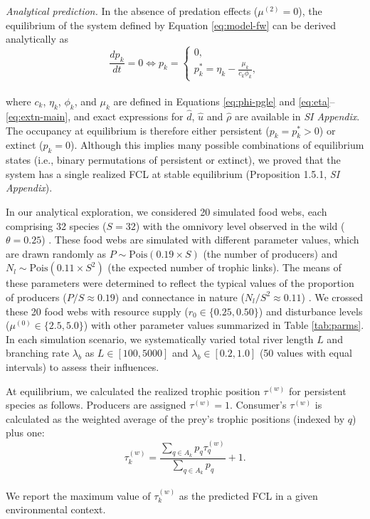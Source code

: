 \documentclass[9pt,twocolumn,twoside]{pnas-new}
\begin{document}
\textit{Analytical prediction.} In the absence of predation effects ($\mu^{(2)} = 0$), the equilibrium of the system defined by Equation \ref{eq:model-fw} can be derived analytically as
\\
\begin{equation}
    \frac{dp_k}{dt} = 0 
    \Leftrightarrow 
    p_k 
    = 
    \begin{cases}
         0,\\
         p_{k}^{*} = \eta_k - \frac{\mu_k}{c_k \phi_k}, 
    \end{cases}
\end{equation}
\\
where $c_k$, $\eta_k$, $\phi_k$, and $\mu_k$ are defined in Equations \ref{eq:phi-pgle} and \ref{eq:eta}--\ref{eq:extn-main}, and exact expressions for $\hat{d}$, $\hat{u}$ and $\hat{\rho}$ are available in \textit{SI Appendix}.
The occupancy at equilibrium is therefore either persistent ($p_k = p_k^* > 0$) or extinct ($p_k = 0$).
Although this implies many possible combinations of equilibrium states (i.e., binary permutations of persistent or extinct), we proved that the system has a single realized FCL at stable equilibrium (Proposition 1.5.1, \textit{SI Appendix}).

In our analytical exploration, we considered 20 simulated food webs, each comprising 32 species ($S = 32$) with the omnivory level observed in the wild ($\theta = 0.25$) \cite{johnson_trophic_2014}.
These food webs are simulated with different parameter values, which are drawn randomly as $P \sim \mbox{Pois}(0.19 \times S)$ (the number of producers) and $N_l \sim \mbox{Pois}(0.11 \times S^2)$ (the expected number of trophic links).
The means of these parameters were determined to reflect the typical values of the proportion of producers ($P / S \approx 0.19$) \citep{briand_community_1984} and connectance in nature ($N_l / S^2 \approx 0.11$) \citep{dunne_food-web_2002}.
We crossed these 20 food webs with resource supply ($r_0 \in \{0.25, 0.50\}$) and disturbance levels ($\mu^{(0)} \in \{2.5, 5.0\}$) with other parameter values summarized in Table \ref{tab:parms}.
In each simulation scenario, we systematically varied total river length $L$ and branching rate $\lambda_b$ as $L \in [100, 5000]$ and $\lambda_b \in [0.2, 1.0]$ (50 values with equal intervals) to assess their influences.

At equilibrium, we calculated the realized trophic position $\tau^{(w)}$ for persistent species as follows.
Producers are assigned $\tau^{(w)} = 1$.
Consumer's $\tau^{(w)}$ is calculated as the weighted average of the prey's trophic positions (indexed by $q$) plus one:
\\
\begin{equation}
    \tau^{(w)}_k = \frac{\sum_{q \in A_{k}} p_{q} \tau^{(w)}_q}{\sum_{q \in A_{k}} p_{q}} + 1.
    \label{eq:def_tp}
\end{equation}
\\
We report the maximum value of $\tau_k^{(w)}$ as the predicted FCL in a given environmental context.
\end{document}
